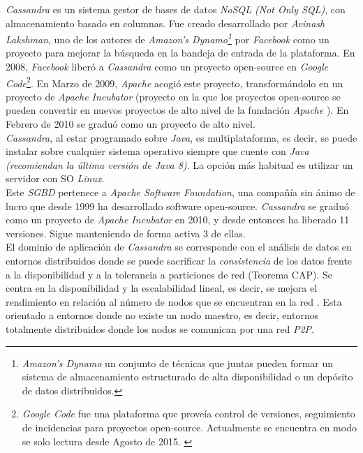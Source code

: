 \documentclass[10pt]{article}
\begin{document}
\emph{Cassandra} es un sistema gestor de bases de datos \emph{NoSQL (Not Only SQL)}, con almacenamiento basado en columnas. Fue creado desarrollado por \emph{Avinash Lakshman}, uno de los autores de \emph{Amazon's Dynamo\footnote{\emph{Amazon's Dynamo} un conjunto de técnicas que juntas pueden formar un sistema de almacenamiento estructurado de alta disponibilidad o un depósito de datos distribuidos.\cite{WIKI:3}}} por \emph{Facebook} como un proyecto para mejorar la búsqueda en la bandeja de entrada de la plataforma. En 2008, \emph{Facebook} liberó a \emph{Cassandra} como un proyecto open-source en \emph{Google Code}\footnote{\emph{Google Code} fue una plataforma que proveía control de versiones, seguimiento de incidencias para proyectos open-source. Actualmente se encuentra en modo se solo lectura desde Agosto de 2015. \cite{WIKI:4}}. En Marzo de 2009, \emph{Apache} acogió este proyecto, transformándolo en un proyecto de \emph{Apache Incubator} (proyecto en la que los proyectos open-source se pueden convertir en nuevos proyectos de alto nivel de la fundación \emph{Apache} \cite{AP:1}). En Febrero de 2010 se graduó como un proyecto de alto nivel. \cite{WIKI:5}\\

\emph{Cassandra}, al estar programado sobre \emph{Java}, es multiplataforma, es decir, se puede instalar sobre cualquier sistema operativo siempre que cuente con \emph{Java (recomiendan la última versión de Java 8)}. La opción más habitual es utilizar un servidor con SO \emph{Linux}. \cite{AP:2}\\

Este \emph{SGBD} pertenece a \emph{Apache Software Foundation}, una compañía sin ánimo de lucro que desde 1999 ha desarrollado software open-source. \emph{Cassandra} se graduó como un proyecto de \emph{Apache Incubator} en 2010, y desde entonces ha liberado 11 versiones. Sigue manteniendo de forma activa 3 de ellas. \cite{AP:5} \\

El dominio de aplicación de \emph{Cassandra} se corresponde con el análisis de datos en entornos distribuidos donde se puede sacrificar la \emph{consistencia} de los datos frente a la disponibilidad y a la tolerancia a particiones de red (Teorema CAP). Se centra en la disponibilidad y la escalabilidad lineal, es decir, se mejora el rendimiento en relación al número de nodos que se encuentran en la red \cite{WIKI:5}. Esta orientado a entornos donde no existe un nodo maestro, es decir, entornos totalmente distribuidos donde los nodos se comunican por una red \emph{P2P}.\\
\end{document}
